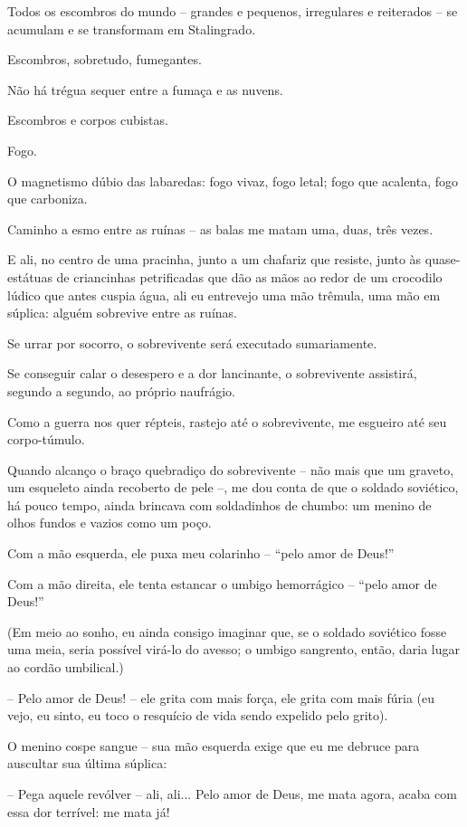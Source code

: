 Todos os escombros do mundo -- grandes e pequenos, irregulares e
reiterados -- se acumulam e se transformam em Stalingrado.

Escombros, sobretudo, fumegantes.

Não há trégua sequer entre a fumaça e as nuvens.

Escombros e corpos cubistas.

Fogo.

O magnetismo dúbio das labaredas: fogo vivaz, fogo letal; fogo que
acalenta, fogo que carboniza.

Caminho a esmo entre as ruínas -- as balas me matam uma, duas, três
vezes.

E ali, no centro de uma pracinha, junto a um chafariz que resiste, junto
às quase-estátuas de criancinhas petrificadas que dão as mãos ao redor
de um crocodilo lúdico que antes cuspia água, ali eu entrevejo uma mão
trêmula, uma mão em súplica: alguém sobrevive entre as ruínas.

Se urrar por socorro, o sobrevivente será executado sumariamente.

Se conseguir calar o desespero e a dor lancinante, o sobrevivente
assistirá, segundo a segundo, ao próprio naufrágio.

Como a guerra nos quer répteis, rastejo até o sobrevivente, me esgueiro
até seu corpo-túmulo.

Quando alcanço o braço quebradiço do sobrevivente -- não mais que um
graveto, um esqueleto ainda recoberto de pele --, me dou conta de que o
soldado soviético, há pouco tempo, ainda brincava com soldadinhos de
chumbo: um menino de olhos fundos e vazios como um poço.

Com a mão esquerda, ele puxa meu colarinho -- ``pelo amor de Deus!''

Com a mão direita, ele tenta estancar o umbigo hemorrágico -- ``pelo
amor de Deus!''

(Em meio ao sonho, eu ainda consigo imaginar que, se o soldado soviético
fosse uma meia, seria possível virá-lo do avesso; o umbigo sangrento,
então, daria lugar ao cordão umbilical.)

-- Pelo amor de Deus! -- ele grita com mais força, ele grita com mais
fúria (eu vejo, eu sinto, eu toco o resquício de vida sendo expelido
pelo grito).

O menino cospe sangue -- sua mão esquerda exige que eu me debruce para
auscultar sua última súplica:

-- Pega aquele revólver -- ali, ali... Pelo amor de Deus, me mata agora,
acaba com essa dor terrível: me mata já!

